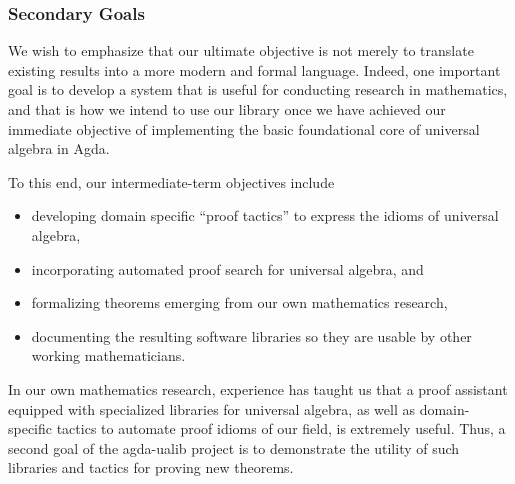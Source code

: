 \documentclass[sigplan,screen]{acmart}
\newcommand{\agdaualib}{\href{https://ualib.org}{agda-ualib}\xspace}
\begin{document}

\subsubsection{Secondary Goals}\label{secondary-goals}
We wish to emphasize that our ultimate objective is not merely to translate existing results into a more modern and formal language. Indeed, one important goal is to develop a system that is useful for conducting research in mathematics, and that is how we intend to use our library once we have achieved our immediate objective of implementing
the basic foundational core of universal algebra in Agda.

To this end, our intermediate-term objectives include
\begin{itemize}
\item developing domain specific ``proof tactics'' to express the idioms of universal algebra,
\item incorporating automated proof search for universal algebra, and
\item formalizing theorems emerging from our own mathematics research,
\item documenting the resulting software libraries so they are usable by other working mathematicians.
\end{itemize}

In our own mathematics research, experience has taught us that a proof assistant equipped with specialized libraries for universal algebra, as well as domain-specific tactics to automate proof idioms of our field, is extremely useful. Thus, a second goal of the agda-ualib project is to demonstrate the utility of such libraries and tactics for proving new theorems.


\end{document}
